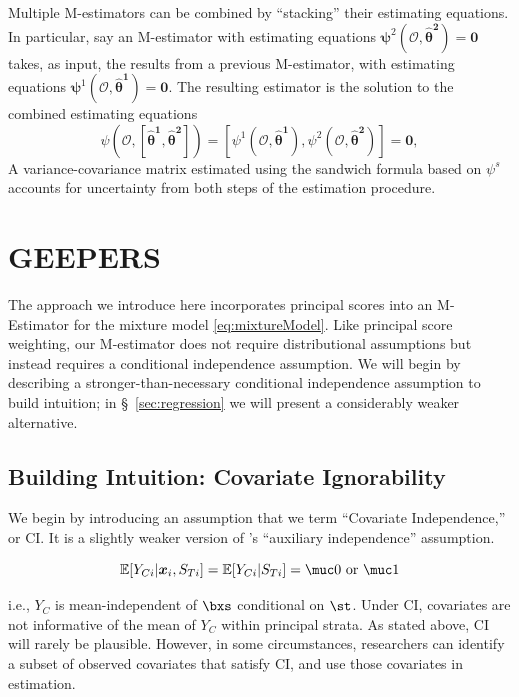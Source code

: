 \documentclass[]{article}
\begin{document}
Multiple M-estimators can be combined by ``stacking'' their estimating equations.
In particular, say an M-estimator with estimating equations $\bm{\psi}^2(\bm{\mathcal{O}},\bm{\hat\theta^2})=\bm{0}$ takes, as input, the results from a previous M-estimator, with estimating equations $\bm{\psi}^1(\bm{\mathcal{O}},\bm{\hat\theta^1})=\bm{0}$.
The resulting estimator is the solution to the combined estimating equations
\begin{equation}\label{eq:stacked}
  \psi(\bm{\mathcal{O}},[\bm{\hat\theta^1},\bm{\hat{\theta}^2}])=[\psi^1(\bm{\mathcal{O}},\bm{\hat\theta^1}),\psi^2(\bm{\mathcal{O}},\bm{\hat\theta^2})]=\bm{0},
\end{equation}
A variance-covariance matrix estimated using the sandwich formula based on $\psi^s$ accounts for uncertainty from both steps of the estimation procedure. 



\section{GEEPERS }\label{sec:geepers}

The approach we introduce here incorporates principal scores into an M-Estimator for the mixture model \eqref{eq:mixtureModel}.
Like principal score weighting, our M-estimator does not require distributional assumptions but instead requires a conditional independence assumption.
We will begin by describing a stronger-than-necessary conditional independence assumption to build intuition; in \S~\ref{sec:regression} we will present a considerably weaker alternative.

\subsection{Building Intuition: Covariate Ignorability}\label{sec:ci}

We begin by introducing an assumption that we term ``Covariate Independence,'' or CI. It is a slightly weaker version of \citet{jiangDing2021}'s ``auxiliary independence'' assumption.
\begin{ass}\label{ass:ci}
\begin{equation}\label{eq:assumption}
\EE[\yci|\bxsi,\sti]=\EE[\yci|\sti]=\muc0\text{ or }\muc1
\end{equation}
\end{ass}
i.e., $Y_C$ is mean-independent of $\bxs$ conditional on $\st$.
Under CI, covariates are not informative of the mean of $Y_C$ within principal strata.
As stated above, CI will rarely be plausible.
However, in some circumstances, researchers can identify a subset of observed covariates that satisfy CI, and use those covariates in estimation.
\end{document}
